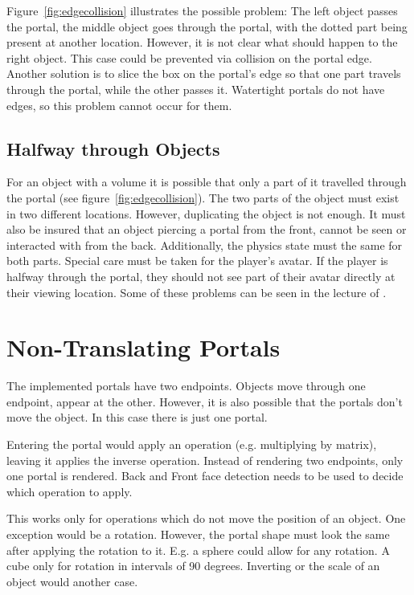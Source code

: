 Figure~\ref{fig:edgecollision} illustrates the possible problem: The left object passes the portal, the middle object goes through the portal, with the dotted part being present at another location. However, it is not clear what should happen to the right object. This case could be prevented via collision on the portal edge. Another solution is to slice the box on the portal's edge so that one part travels through the portal, while the other passes it. Watertight portals do not have edges, so this problem cannot occur for them.

\subsection{Halfway through Objects}
For an object with a volume it is possible that only a part of it travelled through the portal (see figure~\ref{fig:edgecollision}). The two parts of the object must exist in two different locations. However, duplicating the object is not enough. It must also be insured that an object piercing a portal from the front, cannot be seen or interacted with from the back. Additionally, the physics state must the same for both parts. Special care must be taken for the player's avatar. If the player is halfway through the portal, they should not see part of their avatar directly at their viewing location. Some of these problems can be seen in the lecture of \textcite{lecture:portalProblems}.


\section{Non-Translating Portals}
The implemented portals have two endpoints. Objects move through one endpoint, appear at the other. However, it is also possible that the portals don't move the object. In this case there is just one portal.

Entering the portal would apply an operation (e.g. multiplying by matrix), leaving it applies the inverse operation. Instead of rendering two endpoints, only one portal is rendered. Back and Front face detection needs to be used to decide which operation to apply.

This works only for operations which do not move the position of an object. One exception would be a rotation. However, the portal shape must look the same after applying the rotation to it. E.g. a sphere could allow for any rotation. A cube only for rotation in intervals of 90 degrees. Inverting or the scale of an object would another case.




